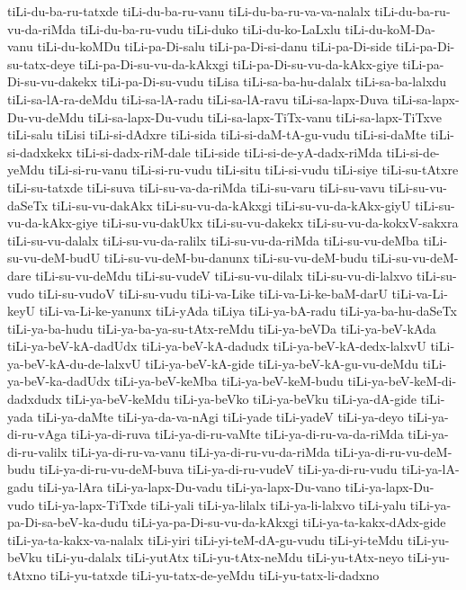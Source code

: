 {tiLi-du-ba-ru-tatxde
tiLi-du-ba-ru-vanu
tiLi-du-ba-ru-va-va-nalalx
tiLi-du-ba-ru-vu-da-riMda
tiLi-du-ba-ru-vudu
tiLi-duko
tiLi-du-ko-LaLxlu
tiLi-du-koM-Da-vanu
tiLi-du-koMDu
tiLi-pa-Di-salu
tiLi-pa-Di-si-danu
tiLi-pa-Di-side
tiLi-pa-Di-su-tatx-deye
tiLi-pa-Di-su-vu-da-kAkxgi
tiLi-pa-Di-su-vu-da-kAkx-giye
tiLi-pa-Di-su-vu-dakekx
tiLi-pa-Di-su-vudu
tiLisa
tiLi-sa-ba-hu-dalalx
tiLi-sa-ba-lalxdu
tiLi-sa-lA-ra-deMdu
tiLi-sa-lA-radu
tiLi-sa-lA-ravu
tiLi-sa-lapx-Duva
tiLi-sa-lapx-Du-vu-deMdu
tiLi-sa-lapx-Du-vudu
tiLi-sa-lapx-TiTx-vanu
tiLi-sa-lapx-TiTxve
tiLi-salu
tiLisi
tiLi-si-dAdxre
tiLi-sida
tiLi-si-daM-tA-gu-vudu
tiLi-si-daMte
tiLi-si-dadxkekx
tiLi-si-dadx-riM-dale
tiLi-side
tiLi-si-de-yA-dadx-riMda
tiLi-si-de-yeMdu
tiLi-si-ru-vanu
tiLi-si-ru-vudu
tiLi-situ
tiLi-si-vudu
tiLi-siye
tiLi-su-tAtxre
tiLi-su-tatxde
tiLi-suva
tiLi-su-va-da-riMda
tiLi-su-varu
tiLi-su-vavu
tiLi-su-vu-daSeTx
tiLi-su-vu-dakAkx
tiLi-su-vu-da-kAkxgi
tiLi-su-vu-da-kAkx-giyU
tiLi-su-vu-da-kAkx-giye
tiLi-su-vu-dakUkx
tiLi-su-vu-dakekx
tiLi-su-vu-da-kokxV-sakxra
tiLi-su-vu-dalalx
tiLi-su-vu-da-ralilx
tiLi-su-vu-da-riMda
tiLi-su-vu-deMba
tiLi-su-vu-deM-budU
tiLi-su-vu-deM-bu-danunx
tiLi-su-vu-deM-budu
tiLi-su-vu-deM-dare
tiLi-su-vu-deMdu
tiLi-su-vudeV
tiLi-su-vu-dilalx
tiLi-su-vu-di-lalxvo
tiLi-su-vudo
tiLi-su-vudoV
tiLi-su-vudu
tiLi-va-Like
tiLi-va-Li-ke-baM-darU
tiLi-va-Li-keyU
tiLi-va-Li-ke-yanunx
tiLi-yAda
tiLiya
tiLi-ya-bA-radu
tiLi-ya-ba-hu-daSeTx
tiLi-ya-ba-hudu
tiLi-ya-ba-ya-su-tAtx-reMdu
tiLi-ya-beVDa
tiLi-ya-beV-kAda
tiLi-ya-beV-kA-dadUdx
tiLi-ya-beV-kA-dadudx
tiLi-ya-beV-kA-dedx-lalxvU
tiLi-ya-beV-kA-du-de-lalxvU
tiLi-ya-beV-kA-gide
tiLi-ya-beV-kA-gu-vu-deMdu
tiLi-ya-beV-ka-dadUdx
tiLi-ya-beV-keMba
tiLi-ya-beV-keM-budu
tiLi-ya-beV-keM-di-dadxdudx
tiLi-ya-beV-keMdu
tiLi-ya-beVko
tiLi-ya-beVku
tiLi-ya-dA-gide
tiLi-yada
tiLi-ya-daMte
tiLi-ya-da-va-nAgi
tiLi-yade
tiLi-yadeV
tiLi-ya-deyo
tiLi-ya-di-ru-vAga
tiLi-ya-di-ruva
tiLi-ya-di-ru-vaMte
tiLi-ya-di-ru-va-da-riMda
tiLi-ya-di-ru-valilx
tiLi-ya-di-ru-va-vanu
tiLi-ya-di-ru-vu-da-riMda
tiLi-ya-di-ru-vu-deM-budu
tiLi-ya-di-ru-vu-deM-buva
tiLi-ya-di-ru-vudeV
tiLi-ya-di-ru-vudu
tiLi-ya-lA-gadu
tiLi-ya-lAra
tiLi-ya-lapx-Du-vadu
tiLi-ya-lapx-Du-vano
tiLi-ya-lapx-Du-vudo
tiLi-ya-lapx-TiTxde
tiLi-yali
tiLi-ya-lilalx
tiLi-ya-li-lalxvo
tiLi-yalu
tiLi-ya-pa-Di-sa-beV-ka-dudu
tiLi-ya-pa-Di-su-vu-da-kAkxgi
tiLi-ya-ta-kakx-dAdx-gide
tiLi-ya-ta-kakx-va-nalalx
tiLi-yiri
tiLi-yi-teM-dA-gu-vudu
tiLi-yi-teMdu
tiLi-yu-beVku
tiLi-yu-dalalx
tiLi-yutAtx
tiLi-yu-tAtx-neMdu
tiLi-yu-tAtx-neyo
tiLi-yu-tAtxno
tiLi-yu-tatxde
tiLi-yu-tatx-de-yeMdu
tiLi-yu-tatx-li-dadxno
}
